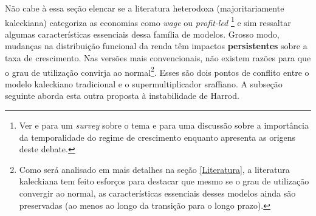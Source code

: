 
Não  cabe à essa seção elencar se a  literatura heterodoxa (majoritariamente kaleckiana)  categoriza as economias como \textit{wage} ou \textit{profit-led}
\footnote{Ver 
	\textcite{setterfield_distribution_2002} 
	e \textcite{onaran_is_2013} para um  \textit{survey} sobre o tema e \textcite{blecker_wage_led_2016} para uma discussão sobre a importância da temporalidade do regime de crescimento enquanto \textcite{lavoie_origins_2017} apresenta as origens deste debate.} 
e sim ressaltar algumas  características essenciais dessa família de modelos. Grosso modo, mudanças na distribuição funcional da renda têm impactos \textbf{persistentes} sobre a taxa de crescimento. Nas versões mais convencionais, não existem razões para que o grau de utilização convirja ao normal\footnote{Como será analisado em mais detalhes na seção \ref{Literatura}, a literatura kaleckiana tem feito esforços para destacar que mesmo se o grau de utilização convergir ao normal, as características essenciais desses modelos ainda são preservadas (ao menos ao longo da transição para o longo prazo).}. Esses são dois pontos de conflito entre o modelo kaleckiano tradicional e o supermultiplicador sraffiano. A subseção seguinte aborda esta outra proposta à instabilidade de Harrod.

